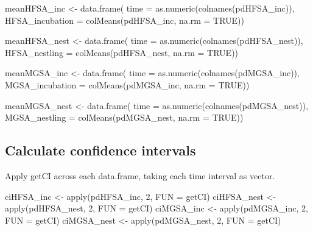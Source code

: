 \documentclass[
]{article}
\newenvironment{Shaded}{\begin{snugshade}}{\end{snugshade}}
\newcommand{\AttributeTok}[1]{\textcolor[rgb]{0.77,0.63,0.00}{#1}}
\newcommand{\ConstantTok}[1]{\textcolor[rgb]{0.00,0.00,0.00}{#1}}
\newcommand{\DecValTok}[1]{\textcolor[rgb]{0.00,0.00,0.81}{#1}}
\newcommand{\FunctionTok}[1]{\textcolor[rgb]{0.00,0.00,0.00}{#1}}
\newcommand{\NormalTok}[1]{#1}
\newcommand{\OtherTok}[1]{\textcolor[rgb]{0.56,0.35,0.01}{#1}}
\begin{document}
\begin{Shaded}
\begin{Highlighting}[]
\NormalTok{meanHFSA\_inc }\OtherTok{\textless{}{-}} \FunctionTok{data.frame}\NormalTok{(}
  \AttributeTok{time =} \FunctionTok{as.numeric}\NormalTok{(}\FunctionTok{colnames}\NormalTok{(pdHFSA\_inc)),}
  \AttributeTok{HFSA\_incubation =} \FunctionTok{colMeans}\NormalTok{(pdHFSA\_inc, }\AttributeTok{na.rm =} \ConstantTok{TRUE}\NormalTok{))}

\NormalTok{meanHFSA\_nest }\OtherTok{\textless{}{-}} \FunctionTok{data.frame}\NormalTok{(}
  \AttributeTok{time =} \FunctionTok{as.numeric}\NormalTok{(}\FunctionTok{colnames}\NormalTok{(pdHFSA\_nest)),}
  \AttributeTok{HFSA\_nestling =} \FunctionTok{colMeans}\NormalTok{(pdHFSA\_nest, }\AttributeTok{na.rm =} \ConstantTok{TRUE}\NormalTok{))}

\NormalTok{meanMGSA\_inc }\OtherTok{\textless{}{-}} \FunctionTok{data.frame}\NormalTok{(}
  \AttributeTok{time =} \FunctionTok{as.numeric}\NormalTok{(}\FunctionTok{colnames}\NormalTok{(pdMGSA\_inc)),}
  \AttributeTok{MGSA\_incubation =} \FunctionTok{colMeans}\NormalTok{(pdMGSA\_inc, }\AttributeTok{na.rm =} \ConstantTok{TRUE}\NormalTok{))}

\NormalTok{meanMGSA\_nest }\OtherTok{\textless{}{-}} \FunctionTok{data.frame}\NormalTok{(}
  \AttributeTok{time =} \FunctionTok{as.numeric}\NormalTok{(}\FunctionTok{colnames}\NormalTok{(pdMGSA\_nest)),}
  \AttributeTok{MGSA\_nestling =} \FunctionTok{colMeans}\NormalTok{(pdMGSA\_nest, }\AttributeTok{na.rm =} \ConstantTok{TRUE}\NormalTok{))}
\end{Highlighting}
\end{Shaded}

\hypertarget{calculate-confidence-intervals-1}{%
\subsection{Calculate confidence
intervals}\label{calculate-confidence-intervals-1}}

Apply getCI across each data.frame, taking each time interval as vector.

\begin{Shaded}
\begin{Highlighting}[]
\NormalTok{ciHFSA\_inc }\OtherTok{\textless{}{-}} \FunctionTok{apply}\NormalTok{(pdHFSA\_inc, }\DecValTok{2}\NormalTok{, }\AttributeTok{FUN =}\NormalTok{ getCI)}
\NormalTok{ciHFSA\_nest }\OtherTok{\textless{}{-}} \FunctionTok{apply}\NormalTok{(pdHFSA\_nest, }\DecValTok{2}\NormalTok{, }\AttributeTok{FUN =}\NormalTok{ getCI)}
\NormalTok{ciMGSA\_inc }\OtherTok{\textless{}{-}} \FunctionTok{apply}\NormalTok{(pdMGSA\_inc, }\DecValTok{2}\NormalTok{, }\AttributeTok{FUN =}\NormalTok{ getCI)}
\NormalTok{ciMGSA\_nest }\OtherTok{\textless{}{-}} \FunctionTok{apply}\NormalTok{(pdMGSA\_nest, }\DecValTok{2}\NormalTok{, }\AttributeTok{FUN =}\NormalTok{ getCI)}
\end{Highlighting}
\end{Shaded}
\end{document}
